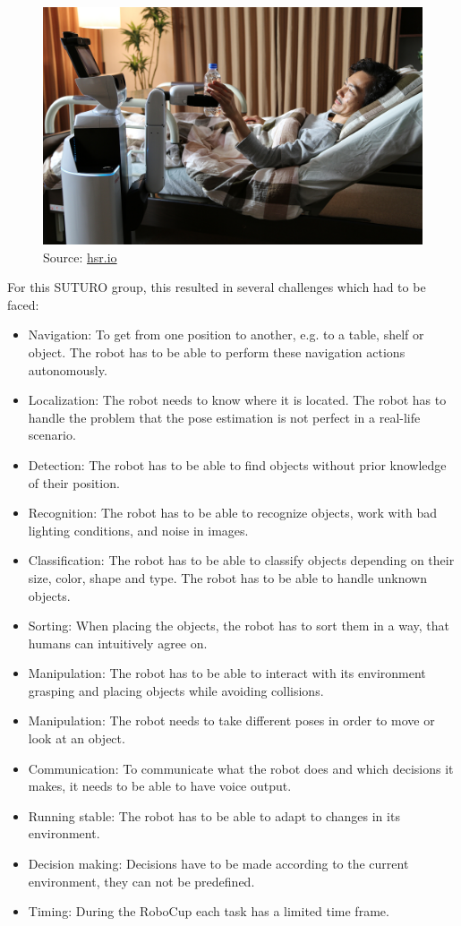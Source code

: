 \documentclass[main.tex]{subfiles}
\begin{document}
	\begin{figure}[H]
		\centering
		\includegraphics[scale=0.375]{pictures/front_page_hsr}
		\caption{Source: \href{www.hsr.io}{hsr.io}}
	\end{figure}
	
	For this SUTURO group, this resulted in several challenges which had to be faced:
	\begin{itemize}
		\item Navigation: To get from one position to another, e.g. to a table, shelf or object. The robot has to be able to perform these navigation actions autonomously.
		\item Localization: The robot needs to know where it is located. The robot has to handle the problem that the pose estimation is not perfect in a real-life scenario.
		\item Detection: The robot has to be able to find objects without prior knowledge of their position.
		\item Recognition: The robot has to be able to recognize objects, work with bad lighting conditions, and noise in images.
		\item Classification: The robot has to be able to classify objects depending on their size, color, shape and type. The robot has to be able to handle unknown objects.
		\item Sorting: When placing the objects, the robot has to sort them in a way, that humans can intuitively agree on.
		\item Manipulation: The robot has to be able to interact with its environment grasping and placing objects while avoiding collisions.
		\item Manipulation: The robot needs to take different poses in order to move or look at an object.
		\item Communication: To communicate what the robot does and which decisions it makes, it needs to be able to have voice output.
		\item Running stable: The robot has to be able to adapt to changes in its environment.
		\item Decision making: Decisions have to be made according to the current environment, they can not be predefined. 
		\item Timing: During the RoboCup each task has a limited time frame.
	\end{itemize}
\end{document}

